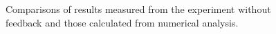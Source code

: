 \begin{figure}[ht]
\centering
{}
\caption{Comparisons of results measured from the experiment without feedback and those calculated from numerical analysis.}
\label{fig:2-12}
\end{figure}

